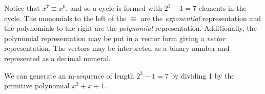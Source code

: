 {\begin{example}
Notice that $x^7\equiv x^0$, and so a cycle is formed with
$2^3-1=7$ elements in the cycle.
The monomials to the left of the $\equiv$ are the {\em exponential}
representation and the polynomials to the right are the {\em polynomial}
representation.
Additionally, the polynomial representation may be put in a vector form giving a
{\em vector} representation.
The vectors may be interpreted as a binary number and represented as a decimal numeral.
\end{example}

\begin{example}
\label{ex:1/p(x)}
We can generate an m-sequence of length
$2^3-1=7$ by dividing 1 by the primitive polynomial $x^3+x+1$.





\end{example}}
